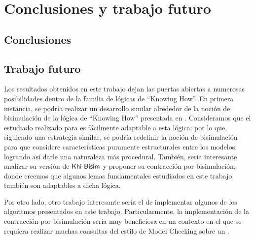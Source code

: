 \chapter{Conclusiones y trabajo futuro}

\section{Conclusiones}


\section{Trabajo futuro}

Los resultados obtenidos en este trabajo dejan las puertas abiertas a numerosas posibilidades dentro de la familia de lógicas de ``Knowing How''. 
En primera instancia, se podría realizar un desarrollo similar alrededor de la noción de bisimulación de la lógica de ``Knowing How'' presentada 
en \cite{Wang15KH,Wang2018GoalDirectedKH}. Consideramos que el estudiado realizado para \KHilogic es fácilmente adaptable a esta lógica; por lo que, siguiendo 
una estrategia similar, se podría redefinir la noción de bisimulación para que considere características puramente estructurales entre los modelos, 
logrando así darle una naturaleza más procedural. También, sería interesante analizar su versión de $\rm\textsf{Khi-Bisim}$ y proponer su contracción 
por bisimulación, donde creemos que algunos lemas fundamentales estudiados en este trabajo también son adaptables a dicha lógica.

Por otro lado, otro trabajo interesante sería el de implementar algunos de los algoritmos presentados en este trabajo. Particularmente, 
la implementación de la contracción por bisimulación sería muy beneficiosa en un contexto en el que se requiera realizar muchas consultas del 
estilo de Model Checking sobre un \ults.

